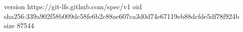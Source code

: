 version https://git-lfs.github.com/spec/v1
oid sha256:339a902f58b009dc58fe6b2c88ae607ca3d0d74e67119eb88dcfde5df78f924b
size 87544
